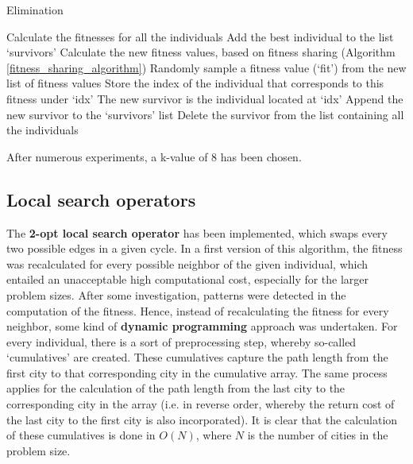 \documentclass[a4paper,10pt]{article}
\newcommand{\ReplaceMe}[1]{{\color{blue}#1}}
\begin{document}
\begin{algorithm}
\caption{Elimination \cite{eiben_smith}}\label{elimination_algorithm}
\begin{algorithmic}
\State Calculate the fitnesses for all the individuals
\State Add the best individual to the list `survivors'
\State Calculate the new fitness values, based on fitness sharing (Algorithm \ref{fitness_sharing_algorithm})
\State Randomly sample a fitness value (`fit') from the new list of fitness values
\State Store the index of the individual that corresponds to this fitness under `idx'
\EndIf
\EndFor
\State The new survivor is the individual located at `idx'
\State Append the new survivor to the `survivors' list
\State Delete the survivor from the list containing all the individuals
\EndFor
\end{algorithmic}
\end{algorithm}

After numerous experiments, a k-value of 8 has been chosen.

\subsection{Local search operators}
\label{local_search_operator}
The \textbf{2-opt local search operator} has been implemented, which swaps every two possible edges in a given cycle. In a first version of this algorithm, the fitness was recalculated for every possible neighbor of the given individual, which entailed an unacceptable high computational cost, especially for the larger problem sizes. After some investigation, patterns were detected in the computation of the fitness. Hence, instead of recalculating the fitness for every neighbor, some kind of \textbf{dynamic programming} approach was undertaken. For every individual, there is a sort of preprocessing step, whereby so-called `cumulatives' are created. These cumulatives capture the path length from the first city to that corresponding city in the cumulative array. The same process applies for the calculation of the path length from the last city to the corresponding city in the array (i.e. in reverse order, whereby the return cost of the last city to the first city is also incorporated). It is clear that the calculation of these cumulatives is done in $O(N)$, where $N$ is the number of cities in the problem size.
\end{document}
